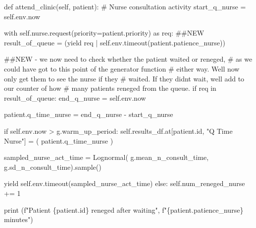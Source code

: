 \documentclass[
  letterpaper,
  DIV=11,
  numbers=noendperiod]{scrreprt}
\newenvironment{Shaded}{\begin{snugshade}}{\end{snugshade}}
\newcommand{\BuiltInTok}[1]{\textcolor[rgb]{0.00,0.23,0.31}{#1}}
\newcommand{\CommentTok}[1]{\textcolor[rgb]{0.37,0.37,0.37}{#1}}
\newcommand{\ControlFlowTok}[1]{\textcolor[rgb]{0.00,0.23,0.31}{#1}}
\newcommand{\DecValTok}[1]{\textcolor[rgb]{0.68,0.00,0.00}{#1}}
\newcommand{\ImportTok}[1]{\textcolor[rgb]{0.00,0.46,0.62}{#1}}
\newcommand{\KeywordTok}[1]{\textcolor[rgb]{0.00,0.23,0.31}{#1}}
\newcommand{\NormalTok}[1]{\textcolor[rgb]{0.00,0.23,0.31}{#1}}
\newcommand{\OperatorTok}[1]{\textcolor[rgb]{0.37,0.37,0.37}{#1}}
\newcommand{\SpecialCharTok}[1]{\textcolor[rgb]{0.37,0.37,0.37}{#1}}
\newcommand{\SpecialStringTok}[1]{\textcolor[rgb]{0.13,0.47,0.30}{#1}}
\newcommand{\StringTok}[1]{\textcolor[rgb]{0.13,0.47,0.30}{#1}}
\newcommand{\VariableTok}[1]{\textcolor[rgb]{0.07,0.07,0.07}{#1}}
\begin{document}
\begin{Shaded}
\begin{Highlighting}[]
\KeywordTok{def}\NormalTok{ attend\_clinic(}\VariableTok{self}\NormalTok{, patient):}
    \CommentTok{\# Nurse consultation activity}
\NormalTok{    start\_q\_nurse }\OperatorTok{=} \VariableTok{self}\NormalTok{.env.now}

    \ControlFlowTok{with} \VariableTok{self}\NormalTok{.nurse.request(priority}\OperatorTok{=}\NormalTok{patient.priority) }\ImportTok{as}\NormalTok{ req:}
        \CommentTok{\#\#NEW}
\NormalTok{        result\_of\_queue }\OperatorTok{=}\NormalTok{ (}\ControlFlowTok{yield}\NormalTok{ req }\OperatorTok{|}
                            \VariableTok{self}\NormalTok{.env.timeout(patient.patience\_nurse))}

        \CommentTok{\#\#NEW {-} we now need to check whether the patient waited or reneged,}
        \CommentTok{\# as we could have got to this point of the generator function}
        \CommentTok{\# either way.  We\textquotesingle{}ll now only get them to see the nurse if they}
        \CommentTok{\# waited.  If they didn\textquotesingle{}t wait, we\textquotesingle{}ll add to our counter of how}
        \CommentTok{\# many patients reneged from the queue.}
        \ControlFlowTok{if}\NormalTok{ req }\KeywordTok{in}\NormalTok{ result\_of\_queue:}
\NormalTok{            end\_q\_nurse }\OperatorTok{=} \VariableTok{self}\NormalTok{.env.now}

\NormalTok{            patient.q\_time\_nurse }\OperatorTok{=}\NormalTok{ end\_q\_nurse }\OperatorTok{{-}}\NormalTok{ start\_q\_nurse}

            \ControlFlowTok{if} \VariableTok{self}\NormalTok{.env.now }\OperatorTok{\textgreater{}}\NormalTok{ g.warm\_up\_period:}
                \VariableTok{self}\NormalTok{.results\_df.at[patient.}\BuiltInTok{id}\NormalTok{, }\StringTok{"Q Time Nurse"}\NormalTok{] }\OperatorTok{=}\NormalTok{ (}
\NormalTok{                    patient.q\_time\_nurse}
\NormalTok{                )}

\NormalTok{            sampled\_nurse\_act\_time }\OperatorTok{=}\NormalTok{ Lognormal(}
\NormalTok{                g.mean\_n\_consult\_time, g.sd\_n\_consult\_time).sample()}

            \ControlFlowTok{yield} \VariableTok{self}\NormalTok{.env.timeout(sampled\_nurse\_act\_time)}
        \ControlFlowTok{else}\NormalTok{:}
            \VariableTok{self}\NormalTok{.num\_reneged\_nurse }\OperatorTok{+=} \DecValTok{1}

            \BuiltInTok{print}\NormalTok{ (}\SpecialStringTok{f"Patient }\SpecialCharTok{\{}\NormalTok{patient}\SpecialCharTok{.}\BuiltInTok{id}\SpecialCharTok{\}}\SpecialStringTok{ reneged after waiting"}\NormalTok{,}
                    \SpecialStringTok{f"}\SpecialCharTok{\{}\NormalTok{patient}\SpecialCharTok{.}\NormalTok{patience\_nurse}\SpecialCharTok{\}}\SpecialStringTok{ minutes"}\NormalTok{)}
\end{Highlighting}
\end{Shaded}
\end{document}
